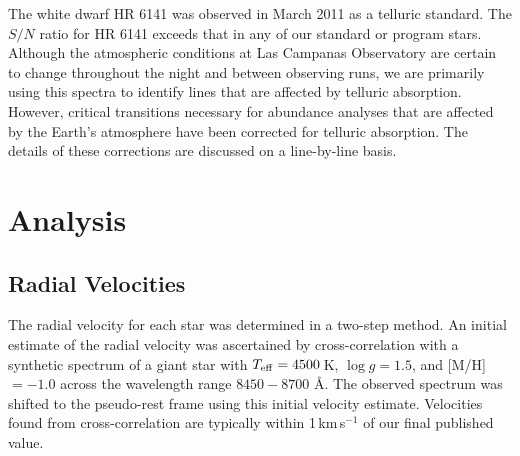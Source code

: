 \documentclass{emulateapj}
\begin{document}
The white dwarf HR 6141 was observed in March 2011 as a telluric standard. The $S/N$ ratio for HR 6141 exceeds that in any of our standard or program stars. Although the atmospheric conditions at Las Campanas Observatory are certain to change throughout the night and between observing runs, we are primarily using this spectra to identify lines that are affected by telluric absorption. However, critical transitions necessary for abundance analyses that are affected by the Earth's atmosphere have been corrected for telluric absorption. The details of these corrections are discussed on a line-by-line basis.

\section{Analysis}
\label{sec:analysis}

\subsection{Radial Velocities}
\label{sec:radial-velocities}

The radial velocity for each star was determined in a two-step method. An initial estimate of the radial velocity was ascertained by cross-correlation with a synthetic spectrum of a giant star with $T_{\rm eff} = 4500$\,K, $\log{g} = 1.5$, and [M/H] $= -1.0$ across the wavelength range $8450 - 8700$ \AA{}. The observed spectrum was shifted to the pseudo-rest frame using this initial velocity estimate. Velocities found from cross-correlation are typically within 1\,km\,s$^{-1}$ of our final published value.
\end{document}
